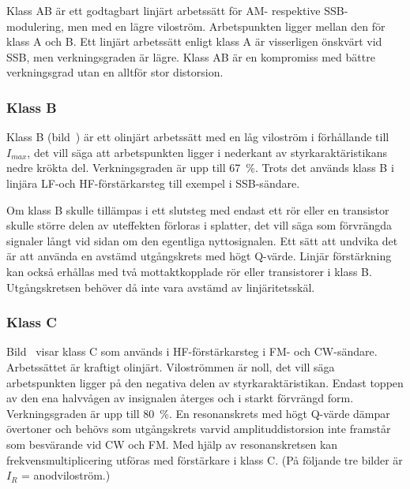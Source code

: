 Klass AB är ett godtagbart linjärt arbetssätt för AM- respektive SSB-modulering,
men med en lägre viloström.
Arbetspunkten ligger mellan den för klass A och B.
Ett linjärt arbetssätt enligt klass A är visserligen önskvärt vid SSB, men
verkningsgraden är lägre.
Klass AB är en kompromiss med bättre verkningsgrad utan en alltför stor
distorsion.


\subsubsection{Klass B}

Klass B (bild~) är ett olinjärt arbetssätt med en låg
viloström i förhållande till \(I_{max}\), det vill säga att arbetspunkten ligger
i nederkant av styrkaraktäristikans nedre krökta del.
Verkningsgraden är upp till 67~\%.
Trots det används klass B i linjära LF-och HF-förstärkarsteg till exempel i
SSB-sändare.

Om klass B skulle tillämpas i ett slutsteg med endast ett rör eller en
transistor skulle större delen av uteffekten förloras i splatter,
det vill säga som förvrängda signaler långt vid sidan om den egentliga
nyttosignalen.
Ett sätt att undvika det är att använda en avstämd utgångskrets med högt
Q-värde.
Linjär förstärkning kan också erhållas med två mottaktkopplade rör eller
transistorer i klass B.
Utgångskretsen behöver då inte vara avstämd av linjäritetsskäl.


\subsubsection{Klass C}

Bild~ visar klass C som används i HF-förstärkar\-steg i
FM- och CW-sändare.
Arbetssättet är kraftigt olinjärt.
Viloströmmen är noll, det vill säga arbetspunkten ligger på den negativa delen
av styrkaraktäristikan.
Endast toppen av den ena halvvågen av insignalen återges och i starkt
förvrängd form.
Verkningsgraden är upp till 80~\%.
En resonanskrets med högt Q-värde dämpar övertoner och behövs som utgångskrets
varvid amplituddistorsion inte framstår som besvärande vid CW och FM.
Med hjälp av resonanskretsen kan frekvensmultiplicering utföras med
förstärkare i klass C.
(På följande tre bilder är \(I_R\) = anodviloström.)

